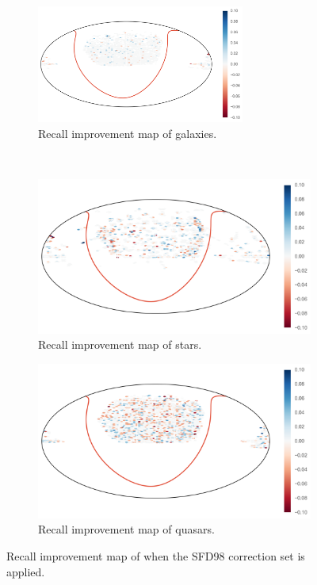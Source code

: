 \begin{figure}[p]
	\centering
	\begin{subfigure}{\textwidth}
		\centering
		\includegraphics[width=0.75\textwidth]{figures/appendix/map_recall_sfd98_Galaxy}
		\caption{Recall improvement map of galaxies.}
		\label{fig:map_recall_sfd98_galaxies}
	\end{subfigure}\\
	\begin{subfigure}{\textwidth}
		\centering
		\includegraphics[width=0.75\linewidth]{figures/appendix/map_recall_sfd98_Star}
		\caption{Recall improvement map of stars.}
		\label{fig:map_recall_sfd98_stars}
	\end{subfigure}
	\begin{subfigure}{\textwidth}
		\centering
		\includegraphics[width=0.75\linewidth]{figures/appendix/map_recall_sfd98_Quasar}
		\caption{Recall improvement map of quasars.}
		\label{fig:map_recall_sfd98_quasars}
	\end{subfigure}
	\caption{Recall improvement map of when the SFD98 correction set is applied.}
	\label{fig:map_recall_sfd98}
\end{figure}


